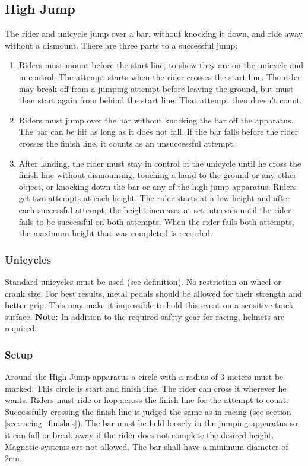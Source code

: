 \subsection{High Jump}
The rider and unicycle jump over a bar, without knocking it down, and ride away without a dismount.
There are three parts to a successful jump: 
\begin{enumerate}
\item Riders must mount before the start line, to show they are on the unicycle and in control.
The attempt starts when the rider crosses the start line.
The rider may break off from a jumping attempt before leaving the ground, but must then start again from behind the start line.
That attempt then doesn't count.
\item Riders must jump over the bar without knocking the bar off the apparatus.
The bar can be hit as long as it does not fall.
If the bar falls before the rider crosses the finish line, it counts as an unsuccessful attempt.
\item After landing, the rider must stay in control of the unicycle until he cross the finish line without dismounting, touching a hand to the ground or any other object, or knocking down the bar or any of the high jump apparatus.
Riders get two attempts at each height.
The rider starts at a low height and after each successful attempt, the height increases at set intervals until the rider fails to be successful on both attempts.
When the rider fails both attempts, the maximum height that was completed is recorded.
\end{enumerate}

\subsubsection{Unicycles}
Standard unicycles must be used (see definition).
No restriction on wheel or crank size.
For best results, metal pedals should be allowed for their strength and better grip.
This may make it impossible to hold this event on a sensitive track surface.
\textbf{Note:} In addition to the required safety gear for racing, helmets are required.

\subsubsection{Setup}
Around the High Jump apparatus a circle with a radius of 3 meters must be marked.
This circle is start and finish line.
The rider can cross it wherever he wants.
Riders must ride or hop across the finish line for the attempt to count.
Successfully crossing the finish line is judged the same as in racing (see section \ref{sec:racing_finishes}).
The bar must be held loosely in the jumping apparatus so it can fall or break away if the rider does not complete the desired height.
Magnetic systems are not allowed.
The bar shall have a minimum diameter of 2cm.

